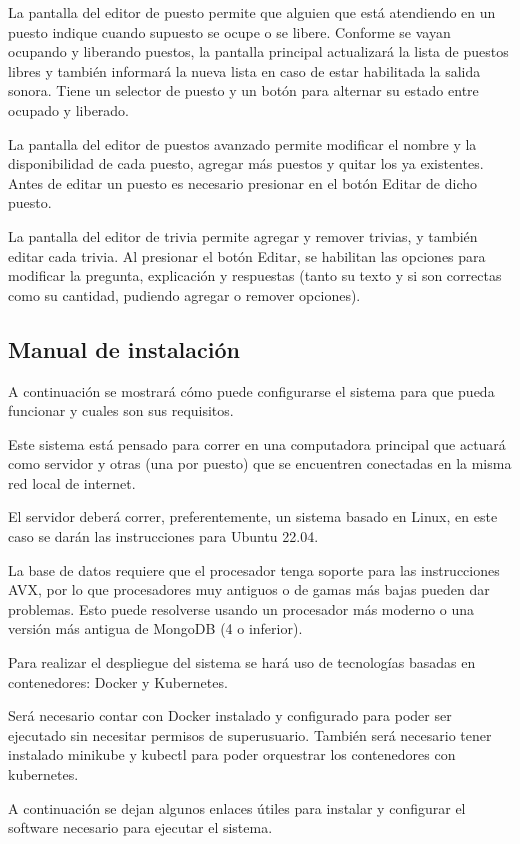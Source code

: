 \documentclass{article}
\begin{document}
La pantalla del editor de puesto permite que alguien que está atendiendo en un puesto indique cuando supuesto se ocupe o se libere. Conforme se vayan ocupando y liberando puestos, la pantalla principal actualizará la lista de puestos libres y también informará la nueva lista en caso de estar habilitada la salida sonora. Tiene un selector de puesto y un botón para alternar su estado entre ocupado y liberado.

La pantalla del editor de puestos avanzado permite modificar el nombre y la disponibilidad de cada puesto, agregar más puestos y quitar los ya existentes. Antes de editar un puesto es necesario presionar en el botón Editar de dicho puesto.

La pantalla del editor de trivia permite agregar y remover trivias, y también editar cada trivia. Al presionar el botón Editar, se habilitan las opciones para modificar la pregunta, explicación y respuestas (tanto su texto y si son correctas como su cantidad, pudiendo agregar o remover opciones).
\newpage
\subsection{Manual de instalación}
A continuación se mostrará cómo puede configurarse el sistema para que pueda funcionar y cuales son sus requisitos.

Este sistema está pensado para correr en una computadora principal que actuará como servidor y otras (una por puesto) que se encuentren conectadas en la misma red local de internet.

El servidor deberá correr, preferentemente, un sistema basado en Linux, en este caso se darán las instrucciones para Ubuntu 22.04.

La base de datos requiere que el procesador tenga soporte para las instrucciones AVX, por lo que procesadores muy antiguos o de gamas más bajas pueden dar problemas. Esto puede resolverse usando un procesador más moderno o una versión más antigua de MongoDB (4 o inferior).

Para realizar el despliegue del sistema se hará uso de tecnologías basadas en contenedores: Docker y Kubernetes.

Será necesario contar con Docker instalado y configurado para poder ser ejecutado sin necesitar permisos de superusuario. También será necesario tener instalado minikube y kubectl para poder orquestrar los contenedores con kubernetes.

A continuación se dejan algunos enlaces útiles para instalar y configurar el software necesario para ejecutar el sistema.
\end{document}
